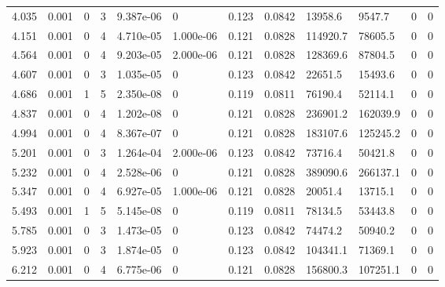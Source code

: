 \documentclass[preview]{standalone}
\begin{document}
{{\begin{tabular}{L{1.2cm}C{1.2cm} C{0.3cm}C{0.5cm} C{1.4cm}C{1.4cm} C{1.4cm}C{1.4cm} C{1.6cm}C{1.6cm} C{1.6cm}C{1.6cm}}
  4.035  &  0.001  & 0     &  3 &  9.387e-06  & 0  &  0.123&   0.0842& 13958.6 & 9547.7   &  0 & 0  \\ 
  4.151  &  0.001  & 0     &  4 &  4.710e-05  & 1.000e-06  &  0.121&   0.0828& 114920.7 & 78605.5   &  0 & 0  \\ 
  4.564  &  0.001  & 0     &  4 &  9.203e-05  & 2.000e-06  &  0.121&   0.0828& 128369.6 & 87804.5   &  0 & 0  \\ 
  4.607  &  0.001  & 0     &  3 &  1.035e-05  & 0  &  0.123&   0.0842& 22651.5 & 15493.6   &  0 & 0  \\ 
  4.686  &  0.001  & 1     &  5 &  2.350e-08  & 0  &  0.119&   0.0811& 76190.4 & 52114.1   &  0 & 0  \\ 
  4.837  &  0.001  & 0     &  4 &  1.202e-08  & 0  &  0.121&   0.0828& 236901.2 & 162039.9   &  0 & 0  \\ 
  4.994  &  0.001  & 0     &  4 &  8.367e-07  & 0  &  0.121&   0.0828& 183107.6 & 125245.2   &  0 & 0  \\ 
  5.201  &  0.001  & 0     &  3 &  1.264e-04  & 2.000e-06  &  0.123&   0.0842& 73716.4 & 50421.8   &  0 & 0  \\ 
  5.232  &  0.001  & 0     &  4 &  2.528e-06  & 0  &  0.121&   0.0828& 389090.6 & 266137.1   &  0 & 0  \\ 
  5.347  &  0.001  & 0     &  4 &  6.927e-05  & 1.000e-06  &  0.121&   0.0828& 20051.4 & 13715.1   &  0 & 0  \\ 
  5.493  &  0.001  & 1     &  5 &  5.145e-08  & 0  &  0.119&   0.0811& 78134.5 & 53443.8   &  0 & 0  \\ 
  5.785  &  0.001  & 0     &  3 &  1.473e-05  & 0  &  0.123&   0.0842& 74474.2 & 50940.2   &  0 & 0  \\ 
  5.923  &  0.001  & 0     &  3 &  1.874e-05  & 0  &  0.123&   0.0842& 104341.1 & 71369.1   &  0 & 0  \\ 
  6.212  &  0.001  & 0     &  4 &  6.775e-06  & 0  &  0.121&   0.0828& 156800.3 & 107251.1   &  0 & 0  \\ 
\hline 
\end{tabular} 

}}
\end{document}
